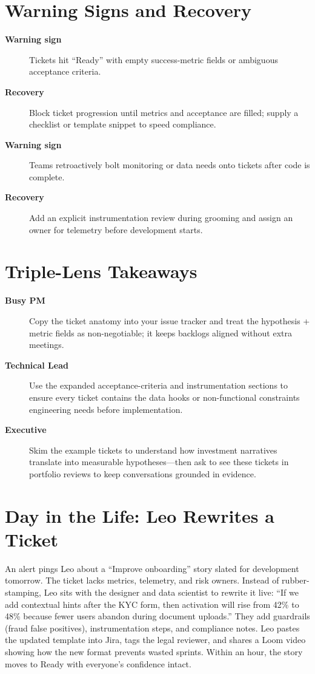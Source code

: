 \section{Warning Signs and Recovery}
\label{sec:tickets-warning}
\begin{description}
    \item[\textbf{Warning sign}] Tickets hit ``Ready'' with empty success-metric fields or ambiguous acceptance criteria.
    \item[\textbf{Recovery}] Block ticket progression until metrics and acceptance are filled; supply a checklist or template snippet to speed compliance.
    \item[\textbf{Warning sign}] Teams retroactively bolt monitoring or data needs onto tickets after code is complete.
    \item[\textbf{Recovery}] Add an explicit instrumentation review during grooming and assign an owner for telemetry before development starts.
\end{description}

\section{Triple-Lens Takeaways}
\label{sec:tickets-triple}

\begin{description}
    \item[\textbf{Busy PM}] Copy the ticket anatomy into your issue tracker and treat the hypothesis + metric fields as non-negotiable; it keeps backlogs aligned without extra meetings.
    \item[\textbf{Technical Lead}] Use the expanded acceptance-criteria and instrumentation sections to ensure every ticket contains the data hooks or non-functional constraints engineering needs before implementation.
    \item[\textbf{Executive}] Skim the example tickets to understand how investment narratives translate into measurable hypotheses—then ask to see these tickets in portfolio reviews to keep conversations grounded in evidence.
\end{description}

\section{Day in the Life: Leo Rewrites a Ticket}
An alert pings Leo about a ``Improve onboarding'' story slated for development tomorrow. The ticket lacks metrics, telemetry, and risk owners. Instead of rubber-stamping, Leo sits with the designer and data scientist to rewrite it live: ``If we add contextual hints after the KYC form, then activation will rise from 42\% to 48\% because fewer users abandon during document uploads.'' They add guardrails (fraud false positives), instrumentation steps, and compliance notes. Leo pastes the updated template into Jira, tags the legal reviewer, and shares a Loom video showing how the new format prevents wasted sprints. Within an hour, the story moves to Ready with everyone's confidence intact.

